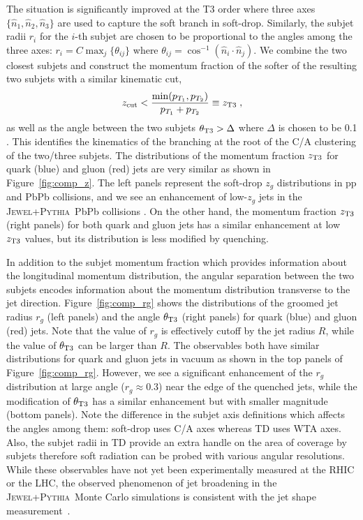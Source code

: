 \documentclass[notoc]{JHEP3}
\newcommand{\jwpy}{\textsc{Jewel+Pythia}~}
\begin{document}
The situation is significantly improved at the T3 order where three axes $\{\hat n_1,\hat n_2,\hat n_3\}$ are used to capture the soft branch in soft-drop. Similarly, the subjet radii $r_i$ for the $i$-th subjet are chosen to be proportional to the angles among the three axes: $r_i = C \max_{j} \{\theta_{ij}\}$ where $\theta_{ij}=\cos^{-1}(\hat n_i\cdot\hat n_j)$. We combine the two closest subjets and construct the momentum fraction of the softer of the resulting two subjets with a similar kinematic cut,
\begin{equation}
    z_{\rm cut} < \frac{\min(p_{T_1},p_{T_2})}{p_{T_1}+p_{T_2}} \equiv z_{\rm T3}\;,
\label{T3_z}
\end{equation}
as well as the angle between the two subjets $\theta_{\rm T3} > \Delta$ where $\Delta$ is chosen to be 0.1 \cite{Sirunyan:2017bsd}. %
This identifies the kinematics of the branching at the root of the C/A clustering of the two/three subjets. The distributions of the momentum fraction $z_{\rm T3}$ for quark (blue) and gluon (red) jets are very similar as shown in Figure~\ref{fig:comp_z}.
The left panels represent the soft-drop $z_{g}$ distributions in pp and PbPb collisions, and we see an enhancement of low-$z_g$ jets in the \jwpy PbPb collisions \cite{KunnawalkamElayavalli:2017hxo,Milhano:2017nzm}. On the other hand, the momentum fraction $z_{\rm T3}$ (right panels) for both quark and gluon jets has a similar enhancement at low $z_{\rm T3}$ values, but its distribution is less modified by quenching.

In addition to the subjet momentum fraction which provides information about the longitudinal momentum distribution, the angular separation between the two subjets encodes information about the momentum distribution transverse to the jet direction. Figure~\ref{fig:comp_rg} shows the distributions of the groomed jet radius $r_g$ (left panels) and the angle $\theta_{\rm T3}$ (right panels) for quark (blue) and gluon (red) jets. Note that the value of $r_g$ is effectively cutoff by the jet radius $R$, while the value of $\theta_{\rm T3}$ can be larger than $R$. The observables both have similar distributions for quark and gluon jets in vacuum as shown in the top panels of Figure~\ref{fig:comp_rg}. However, we see a significant enhancement of the $r_g$ distribution at large angle ($r_g\approx0.3$) near the edge of the quenched jets, while the modification of $\theta_{\rm T3}$ has a similar enhancement but with smaller magnitude (bottom panels). Note the difference in the subjet axis definitions which affects the angles among them: soft-drop uses C/A axes whereas TD uses WTA axes. Also, the subjet radii in TD provide an extra handle on the area of coverage by subjets therefore soft radiation can be probed with various angular resolutions. While these observables have not yet been experimentally measured at the RHIC or the LHC, the observed phenomenon of jet broadening in the \jwpy Monte Carlo simulations is consistent with the jet shape measurement~\cite{Chatrchyan:2013kwa}.
\end{document}
